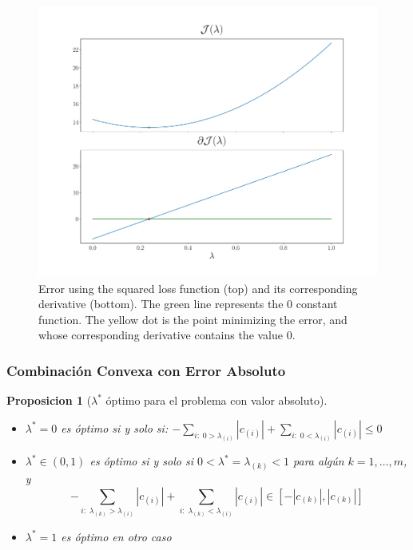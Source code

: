 \documentclass[aspectratio=43]{beamer}
\newtheorem{proposition}[theorem]{Proposicion}
\newcommand{\abs}[1]{\left|#1\right|}
\newcommand{\npertask}{m}
\begin{document}
\begin{frame}

      \begin{figure}[t!]
            \centering
            \includegraphics[width=.6\textwidth]{Chapter4/NeuroCom2021/ejemplo2_mse.pdf}
            \caption{Error using the squared loss function (top) and its corresponding derivative (bottom). The green line represents the $0$ constant function. The yellow dot is the point minimizing the error, and whose corresponding derivative contains the value $0$.}
            \label{fig:sq_error}
        \end{figure}      

\end{frame}



\begin{frame}
      \frametitle{Combinación Convexa con Error Absoluto}

      \begin{proposition}[$\lambda^*$ óptimo para el problema con valor absoluto]\label{prop:abs_neurocom2020}
            \begin{itemize}
                  \item $\lambda^*=0$ es óptimo si y solo si: $- \sum_{i: \; 0 > \lambda_{(i)}} \abs{c_{(i)}} + \sum_{i: \; 0 < \lambda_{(i)}} \abs{c_{(i)}} \leq 0$
                  \item $\lambda^* \in (0,1)$ es óptimo si y solo si $0 < \lambda^* = \lambda_{(k)} < 1$ para algún $k=1, \dotsc, \npertask$, y
                  \begin{equation}
                  \nonumber    
                  - \sum_{i:\; \lambda_{(k)} > \lambda_{(i)}} \abs{c_{(i)}} + \sum_{i:\; \lambda_{(k)} < \lambda_{(i)}} \abs{c_{(i)}} \in \left[ -  \abs{c_{(k)}},  \abs{c_{(k)}}  \right] 
                  \end{equation}
                  \item $\lambda^*=1$ es óptimo en otro caso
            \end{itemize}
        \end{proposition}
\end{frame}
\end{document}
